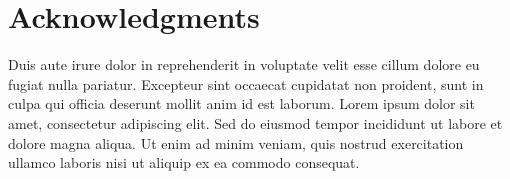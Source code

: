 %
\chapter*{Acknowledgments}
\label{c:Acknowledgments}
%
\noindent
Duis aute irure dolor in reprehenderit in voluptate velit esse cillum dolore eu fugiat nulla pariatur.
Excepteur sint occaecat cupidatat non proident, sunt in culpa qui officia deserunt mollit anim id est laborum.
Lorem ipsum dolor sit amet, consectetur adipiscing elit. 
Sed do eiusmod tempor incididunt ut labore et dolore magna aliqua. 
Ut enim ad minim veniam, quis nostrud exercitation ullamco laboris nisi ut aliquip ex ea commodo consequat.
%
